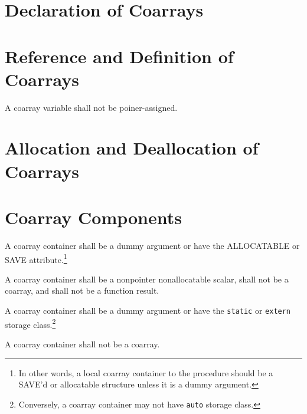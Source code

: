 \section{Declaration of Coarrays}
\label{sec:Declaration of Coarrays}


\section{Reference and Definition of Coarrays}
\label{sec:Reference and Definition of Coarrays}

\begin{Constraints C}
\item A coarray variable shall not be poiner-assigned.
\end{Constraints C}

\section{Allocation and Deallocation of Coarrays}
\label{sec:Allocation and Deallocation of Coarrays}

\section{Coarray Components}
\label{sec:Coarray Components}

\begin{Constraints F}
\item A coarray container shall be a dummy argument or have 
the ALLOCATABLE or SAVE attribute.\footnote
{In other words, a local coarray container to the procedure should be a SAVE'd or 
allocatable structure unless it is a dummy argument.}

\item A coarray container shall be a nonpointer nonallocatable scalar, 
shall not be a coarray, and shall not be a function result. 
\end{Constraints F}

\begin{Constraints C}
\item A coarray container shall be a dummy argument or have the {\tt static} 
or {\tt extern} storage class.\footnote
{Conversely, a coarray container may not have {\tt auto} storage class.}

\item A coarray container shall not be a coarray.

\end{Constraints C}


